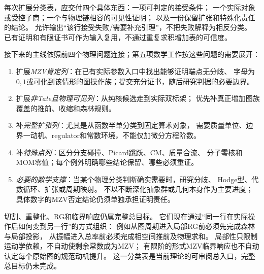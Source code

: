 \documentclass[11pt,a4paper]{ctexart}
\theoremstyle{cnplain}\newtheorem{theorem}{定理}[section]
\theoremstyle{definition}\newtheorem{definition}[theorem]{定义}
\theoremstyle{remark}\newtheorem{remark}[theorem]{注}
\begin{document}
每次扩展分类表，应交付四个具体东西：一项可判定的接受条件；
一个实际对象或受控子商；一个与物理链相容的可见性证明；
以及一份保留扩张和特殊化责任的结论。
允许输出“该行接受失败/需要补充引理”，不把失败解释为相反分类。
已有证明和有限证书可作为输入复用，不通过重复求积增加表的可信度。

接下来的主线依照前四个物理问题连接；第五项数学工作按这些问题的需要展开：
\begin{enumerate}
 \item 扩展\emph{MZV肯定列}：在已有实际参数入口中找出能够证明端点无分歧、
 字母为$0,1$或可化到该情形的图操作族；提交充分证书，随后研究判据的必要边界。
 \item 扩展\emph{非Tate且物理可见列}：从纯核候选走到实际双标架；
 优先补真正增加图族覆盖的推前、收缩和森林规则。
 \item 补\emph{完整扩张列}：尤其是从函数半单分类到固定算术对象，
 需要质量单位、边界一动机、regulator和常数环境，不能仅加微分方程阶数。
 \item 补\emph{特殊点列}：区分分支碰撞、Picard跳跃、CM、质量合流、
 分子零核和MOM零值；每个例外明确哪些结论保留、哪些必须重证。
 \item \emph{必要的数学支撑}：当某个物理分类判断确实需要时，研究分歧、
 Hodge型、代数循环、扩张或周期映射。
 不以不断深化抽象群或几何本身作为主要进度；
 具体数字的MZV否定结论仍须单独承担证明责任。
\end{enumerate}
切割、重整化、RG和临界响应仍属完整总目标。
它们现在通过“同一行在实际操作后如何变到另一行”的方式组织：
例如从图周期进入局部RG前必须先完成森林与局部投影，
从振幅进入总率前必须完成相空间推前及物理求和。
局部性只限制运动学依赖，不自动使剩余常数成为MZV；
有限阶的形式MZV临界响应也不自动认定每个原始图的规范动机提升。
这一分类表是当前理论的可审阅总入口，完整总目标仍未完成。
\end{document}
